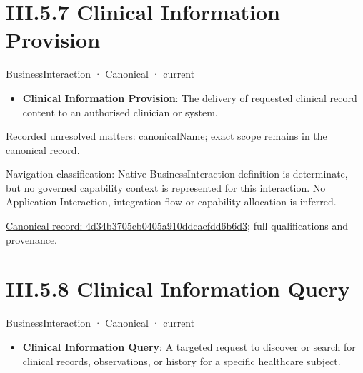 \section*{III.5.7 Clinical Information Provision}
\label{navigation:III.5.7}

\label{element:4d34b3705cb0405a910ddcacfdd6b6d3}
{\small BusinessInteraction · Canonical · current}\par

\begin{itemize}


\item \textbf{Clinical Information Provision}: The delivery of requested clinical record content to an authorised clinician or system.

\end{itemize}

{\small Recorded unresolved matters: canonicalName; exact scope remains in the canonical record.}\par
{\small Navigation classification: Native BusinessInteraction definition is determinate, but no governed capability context is represented for this interaction. No Application Interaction, integration flow or capability allocation is inferred.}\par
{\footnotesize \href{../../../../../../../../continuum/business/business-interaction/4d34b3705cb0405a910ddcacfdd6b6d3.md}{Canonical record: 4d34b3705cb0405a910ddcacfdd6b6d3}; full qualifications and provenance.}\par
\section*{III.5.8 Clinical Information Query}
\label{navigation:III.5.8}

\label{element:8aabfdf9c83c4de486cf5f50c41c0d5e}
{\small BusinessInteraction · Canonical · current}\par

\begin{itemize}


\item \textbf{Clinical Information Query}: A targeted request to discover or search for clinical records, observations, or history for a specific healthcare subject.

\end{itemize}

